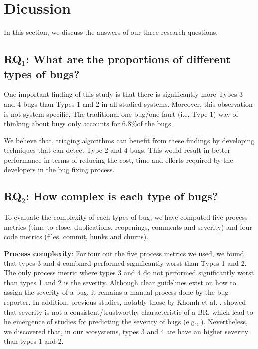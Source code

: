 
\section{Dicussion}

In this section, we discuss the answers of our three research questions.

\subsection{RQ$_1$: What are the proportions of different types of
bugs?}


One important finding of this study is that there is significantly more Types 3 and 4 bugs than Types 1 and 2 in all studied systems.
Moreover, this observation is not system-specific.
The traditional one-bug/one-fault (i.e. Type 1) way of thinking about bugs only accounts for 6.8\%of the bugs.

We believe that, triaging algorithms \cite{Jalbert2008,Jeong2009,Khomh2011a,Tamrawi2011a} can benefit from these findings by developing techniques that can detect Type 2 and 4 bugs.
This would result in better performance in terms of reducing the cost, time and efforts required by the developers in the bug fixing process.

\subsection{RQ$_2$: How complex is each type of bugs?}

To evaluate the complexity of each types of bug, we have computed five process metrics (time to close, duplications, reopenings, comments and severity) and four code metrics (files, commit, hunks and churns).

{\bf Process complexity}: For four out the five process metrics we used, we found that types 3 and 4 combined performed significantly worst than Types 1 and 2.
The only process metric where types 3 and 4 do not performed significantly worst than types 1 and 2 is the severity.
Although clear guidelines exist on how to assign the severity of a bug, it remains a manual process done by the bug reporter.
In addition, previous studies, notably those by Khomh et al.
\cite{Khomh2011a}, showed that severity is not a consistent/trustworthy characteristic of a BR, which lead to he emergence of studies for predicting the severity of bugs (e.g., \cite{Lamkanfi2010,Lamkanfi2011,Tian2012}).
Nevertheless, we discovered that, in our ecosystems, types 3 and 4 are  have an higher severity than types 1 and 2.

